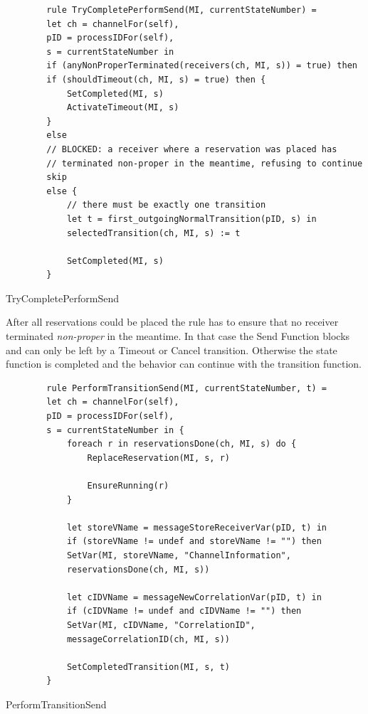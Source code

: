 \begin{listing}[H]
	\begin{verbatim}
		rule TryCompletePerformSend(MI, currentStateNumber) =
		let ch = channelFor(self),
		pID = processIDFor(self),
		s = currentStateNumber in
		if (anyNonProperTerminated(receivers(ch, MI, s)) = true) then
		if (shouldTimeout(ch, MI, s) = true) then {
			SetCompleted(MI, s)
			ActivateTimeout(MI, s)
		}
		else
		// BLOCKED: a receiver where a reservation was placed has
		// terminated non-proper in the meantime, refusing to continue
		skip
		else {
			// there must be exactly one transition
			let t = first_outgoingNormalTransition(pID, s) in
			selectedTransition(ch, MI, s) := t
			
			SetCompleted(MI, s)
		}
	\end{verbatim}
	\caption{TryCompletePerformSend}
	\label{lst:shortasm:TryCompletePerformSend}
\end{listing}

After all reservations could be placed the 
rule has to ensure that no receiver terminated \textit{non-proper} in the
meantime. In that case the Send Function blocks and can only be left by a
Timeout or Cancel transition. Otherwise the state function is completed and the behavior can
continue with the transition function.

\begin{listing}[H]
	\begin{verbatim}
		rule PerformTransitionSend(MI, currentStateNumber, t) =
		let ch = channelFor(self),
		pID = processIDFor(self),
		s = currentStateNumber in {
			foreach r in reservationsDone(ch, MI, s) do {
				ReplaceReservation(MI, s, r)
				
				EnsureRunning(r)
			}
			
			let storeVName = messageStoreReceiverVar(pID, t) in
			if (storeVName != undef and storeVName != "") then
			SetVar(MI, storeVName, "ChannelInformation",
			reservationsDone(ch, MI, s))
			
			let cIDVName = messageNewCorrelationVar(pID, t) in
			if (cIDVName != undef and cIDVName != "") then
			SetVar(MI, cIDVName, "CorrelationID",
			messageCorrelationID(ch, MI, s))
			
			SetCompletedTransition(MI, s, t)
		}
	\end{verbatim}
	\caption{PerformTransitionSend}
	\label{lst:shortasm:PerformTransitionSend}
\end{listing}

